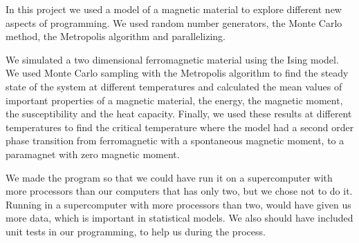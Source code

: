 In this project we used a model of a magnetic material to explore different new aspects of programming. We used random number generators, the Monte Carlo method, the Metropolis algorithm and parallelizing.

We simulated a two dimensional ferromagnetic material using the Ising model. We used Monte Carlo sampling with the Metropolis algorithm to find the steady state of the system at different temperatures and calculated the mean values of important properties of a magnetic material, the energy, the magnetic moment, the susceptibility and the heat capacity. Finally, we used these results at different temperatures to find the critical temperature where the model had a second order phase transition from ferromagnetic with a spontaneous magnetic moment, to a paramagnet with zero magnetic moment. 

We made the program so that we could have run it on a supercomputer with more processors than our computers that has only two, but we chose not to do it. Running in a supercomputer with more processors than two, would have given us more data, which is important in statistical models. We also should have included unit tests in our programming, to help us during the process. 